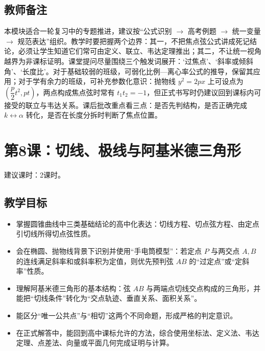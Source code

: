 \documentclass[UTF8,a4paper,11pt]{ctexart}
\begin{document}
\subsection*{教师备注}

本模块适合一轮复习中的专题推进，建议按“公式识别 $\to$ 高考例题 $\to$ 统一变量 $\to$ 规范表达”组织。教学时要把握两个边界：其一，不把焦点弦公式讲成死记结论，必须让学生知道它们常可由定义、联立、韦达定理推出；其二，不让统一视角越界为非课标证明。课堂提问尽量围绕三个触发词展开：‘过焦点’、‘斜率或倾斜角’、‘长度比’。对于基础较弱的班级，可弱化比例—离心率公式的推导，保留其应用；对于学有余力的班级，可补充参数化意识：抛物线 $y^2=2px$ 上可设点为 $\left(\dfrac p2 t^2,pt\right)$，两点构成焦点弦时常有 $t_1t_2=-1$，但正式书写时仍建议回到课标内可接受的联立与韦达关系。课后批改重点看三点：是否先判结构，是否正确完成 $k\leftrightarrow \alpha$ 转化，是否在长度分拆时判断了焦点位置。

\clearpage

\section{第8课：切线、极线与阿基米德三角形}

\noindent 建议课时：2课时。

\subsection*{教学目标}

\begin{itemize}

\item 掌握圆锥曲线中三类基础结论的高中化表达：切线方程、切点弦方程、由定点引切线所得切点弦性质。

\item 会在椭圆、抛物线背景下识别并使用“手电筒模型”：若定点 $P$ 与两交点 $A,B$ 的连线满足斜率和或斜率积为定值，则优先预判弦 $AB$ 的“过定点”或“定斜率”性质。

\item 理解阿基米德三角形的基本结构：弦 $AB$ 与两端点切线交点构成的三角形，并能把“切线条件”转化为“交点轨迹、垂直关系、面积关系”。

\item 能区分“唯一公共点”与“相切”这两个不同命题，形成严格的判定意识。

\item 在正式解答中，能回到高中课标允许的方法，综合使用坐标法、定义法、韦达定理、点差法、向量或平面几何完成证明与计算。

\end{itemize}
\end{document}
